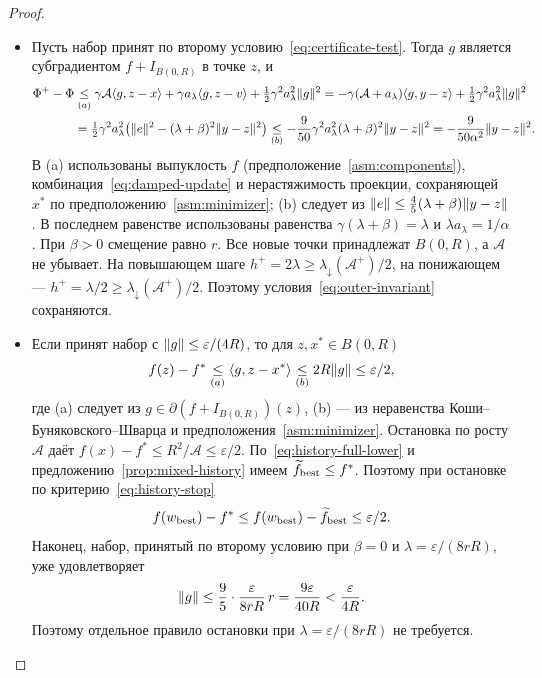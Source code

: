 \begin{proof}
\begin{itemize}
по предположению~\ref{asm:minimizer}.
Это даёт \eqref{eq:cut-descent}. Принадлежность $x$ полупространству
для рассуждения не нужна.
\item Пусть набор принят по второму условию~\eqref{eq:certificate-test}.
Тогда $g$ является субградиентом $f+I_{B(0,R)}$ в точке $z$, и
\begin{align*}
 \Phi^+-\Phi&\mathrel{\underset{(a)}{\le}}
 \gamma\mathcal A\langle g,z-x\rangle+\gamma a_\lambda\langle g,z-v\rangle
       +\tfrac12\gamma^2a_\lambda^2\lVert g\rVert^2 =-\gamma(\mathcal A+a_\lambda)\langle g,y-z\rangle
       +\tfrac12\gamma^2a_\lambda^2\lVert g\rVert^2
 \\&=\tfrac12\gamma^2a_\lambda^2
       \bigl(\lVert e\rVert^2-(\lambda+\beta)^2\lVert y-z\rVert^2\bigr) \mathrel{\underset{(b)}{\le}}
 -\frac9{50}\gamma^2a_\lambda^2(\lambda+\beta)^2\lVert y-z\rVert^2
 =-\frac9{50\alpha^2}\lVert y-z\rVert^2.
\end{align*}
В (a) использованы выпуклость $f$ (предположение~\ref{asm:components}),
комбинация~\eqref{eq:damped-update} и нерастяжимость проекции,
сохраняющей $x^\ast$ по предположению~\ref{asm:minimizer};
(b) следует из $\lVert e\rVert\le\frac45(\lambda+\beta)\lVert y-z\rVert$.
В последнем равенстве использованы равенства $\gamma(\lambda+\beta)=\lambda$ и
$\lambda a_\lambda=1/\alpha$.
При $\beta>0$ смещение равно $r$. Все новые точки принадлежат
$B(0,R)$, а $\mathcal A$ не убывает. На повышающем шаге
$h^+=2\lambda\ge\lambda_\downarrow(\mathcal A^+)/2$,
на понижающем --- $h^+=\lambda/2\ge\lambda_\downarrow(\mathcal A^+)/2$.
Поэтому условия~\eqref{eq:outer-invariant} сохраняются.
\item Если принят набор с $\lVert g\rVert\le\varepsilon/(4R)$, то для
$z,x^\ast\in B(0,R)$
\[
 f(z)-f^\ast
 \mathrel{\underset{(a)}{\le}}\langle g,z-x^\ast\rangle
 \mathrel{\underset{(b)}{\le}}2R\lVert g\rVert\le\varepsilon/2,
\]
где (a) следует из $g\in\partial(f+I_{B(0,R)})(z)$, (b) --- из
неравенства Коши--Буняковского--Шварца
и предположения~\ref{asm:minimizer}.
Остановка по росту $\mathcal A$ даёт
$f(x)-f^\ast\le R^2/\mathcal A\le\varepsilon/2$.
По~\eqref{eq:history-full-lower} и предложению~\ref{prop:mixed-history}
имеем $\widetilde f_{\rm best}\le f^\ast$. Поэтому при остановке
по критерию~\eqref{eq:history-stop}
\[
 f(w_{\rm best})-f^\ast
 \le f(w_{\rm best})-\widetilde f_{\rm best}\le\varepsilon/2.
\]
Наконец, набор, принятый по второму условию при $\beta=0$ и
$\lambda=\varepsilon/(8rR)$, уже удовлетворяет
\[
 \lVert g\rVert\le\frac95\cdot\frac{\varepsilon}{8rR}\,r=\frac{9\varepsilon}{40R}<\frac{\varepsilon}{4R}.
\]
Поэтому отдельное правило остановки при $\lambda=\varepsilon/(8rR)$ не требуется.
\end{itemize}
\end{proof}

